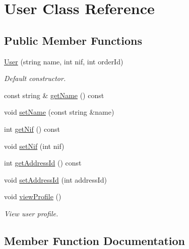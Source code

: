 \hypertarget{class_user}{}\section{User Class Reference}
\label{class_user}
\subsection*{Public Member Functions}
\begin{DoxyCompactItemize}
\item 
\mbox{\label{class_user_ab0ca7310b6678d94f634dbe4c1db3d1c}} 
\hyperlink{class_user_ab0ca7310b6678d94f634dbe4c1db3d1c}{User} (string name, int nif, int order\+Id)
\begin{DoxyCompactList}\small\item\em Default constructor. \end{DoxyCompactList}\item 
const string \& \hyperlink{class_user_ab5cb41f37a4f2d10c02a38aaeb130a8d}{get\+Name} () const
\item 
void \hyperlink{class_user_ac44eb16e566dd060399e8f87ceec3fac}{set\+Name} (const string \&name)
\item 
int \hyperlink{class_user_aace9e5f20472601ce1e937b1bf92d707}{get\+Nif} () const
\item 
void \hyperlink{class_user_a31dd2dcc59d3123cd71dc87fb97c701f}{set\+Nif} (int nif)
\item 
int \hyperlink{class_user_a257e984799541917ad7fa1214f108bd0}{get\+Address\+Id} () const
\item 
void \hyperlink{class_user_a45fd50444975eb216feb4edd5ad1182e}{set\+Address\+Id} (int address\+Id)
\item 
\mbox{\label{class_user_a4eb0ea07c0c506189633fe0cd707b64a}} 
void \hyperlink{class_user_a4eb0ea07c0c506189633fe0cd707b64a}{view\+Profile} ()
\begin{DoxyCompactList}\small\item\em View user profile. \end{DoxyCompactList}\end{DoxyCompactItemize}


\subsection{Member Function Documentation}
\mbox{\label{class_user_a257e984799541917ad7fa1214f108bd0}} 
